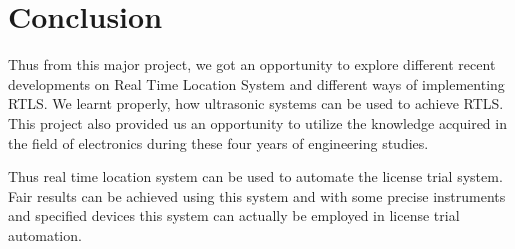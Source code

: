 \section{Conclusion}
Thus from this major project, we got an opportunity to explore different recent developments on Real Time Location System and different ways of implementing RTLS. We learnt properly, how ultrasonic systems can be used to achieve RTLS. This project also provided us an opportunity to utilize the knowledge acquired in the field of electronics during these four years of engineering studies.  

Thus real time location system can be used to automate the license trial system. Fair results can be achieved using this system and with some precise instruments and specified devices this system can actually be employed in license trial automation. 
